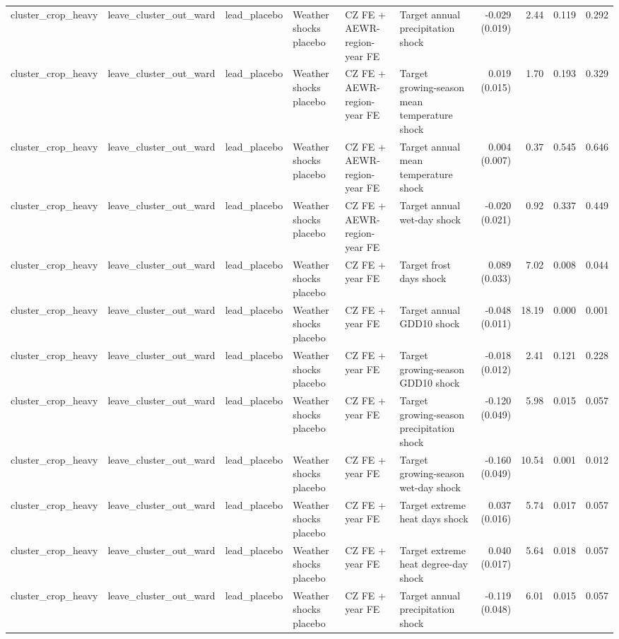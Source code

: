 \begin{tabular}{llllllrrrr}
cluster_crop_heavy & leave_cluster_out_ward & lead_placebo & Weather shocks placebo & CZ FE + AEWR-region-year FE & Target annual precipitation shock & -0.029 (0.019) & 2.44 & 0.119 & 0.292 \\
cluster_crop_heavy & leave_cluster_out_ward & lead_placebo & Weather shocks placebo & CZ FE + AEWR-region-year FE & Target growing-season mean temperature shock & 0.019 (0.015) & 1.70 & 0.193 & 0.329 \\
cluster_crop_heavy & leave_cluster_out_ward & lead_placebo & Weather shocks placebo & CZ FE + AEWR-region-year FE & Target annual mean temperature shock & 0.004 (0.007) & 0.37 & 0.545 & 0.646 \\
cluster_crop_heavy & leave_cluster_out_ward & lead_placebo & Weather shocks placebo & CZ FE + AEWR-region-year FE & Target annual wet-day shock & -0.020 (0.021) & 0.92 & 0.337 & 0.449 \\
cluster_crop_heavy & leave_cluster_out_ward & lead_placebo & Weather shocks placebo & CZ FE + year FE & Target frost days shock & 0.089 (0.033) & 7.02 & 0.008 & 0.044 \\
cluster_crop_heavy & leave_cluster_out_ward & lead_placebo & Weather shocks placebo & CZ FE + year FE & Target annual GDD10 shock & -0.048 (0.011) & 18.19 & 0.000 & 0.001 \\
cluster_crop_heavy & leave_cluster_out_ward & lead_placebo & Weather shocks placebo & CZ FE + year FE & Target growing-season GDD10 shock & -0.018 (0.012) & 2.41 & 0.121 & 0.228 \\
cluster_crop_heavy & leave_cluster_out_ward & lead_placebo & Weather shocks placebo & CZ FE + year FE & Target growing-season precipitation shock & -0.120 (0.049) & 5.98 & 0.015 & 0.057 \\
cluster_crop_heavy & leave_cluster_out_ward & lead_placebo & Weather shocks placebo & CZ FE + year FE & Target growing-season wet-day shock & -0.160 (0.049) & 10.54 & 0.001 & 0.012 \\
cluster_crop_heavy & leave_cluster_out_ward & lead_placebo & Weather shocks placebo & CZ FE + year FE & Target extreme heat days shock & 0.037 (0.016) & 5.74 & 0.017 & 0.057 \\
cluster_crop_heavy & leave_cluster_out_ward & lead_placebo & Weather shocks placebo & CZ FE + year FE & Target extreme heat degree-day shock & 0.040 (0.017) & 5.64 & 0.018 & 0.057 \\
cluster_crop_heavy & leave_cluster_out_ward & lead_placebo & Weather shocks placebo & CZ FE + year FE & Target annual precipitation shock & -0.119 (0.048) & 6.01 & 0.015 & 0.057 \\

\end{tabular}
